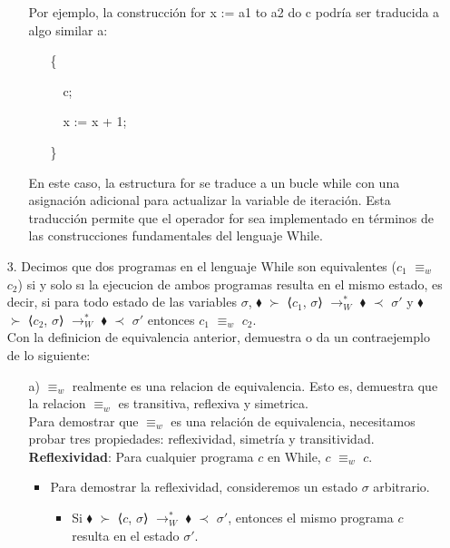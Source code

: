 \documentclass{article}
\begin{document}
\begin{itemize}
\begin{itemize}
            Por ejemplo, la construcción for x := a1 to a2 do c podría ser traducida a algo similar a:

            \begin{itemize}
                \item[ ]    \{
                \item[ ] \, \,       c;
                \item[ ] \, \,       x := x + 1;
                \item[ ]    \}
            \end{itemize}

            En este caso, la estructura for se traduce a un bucle while con una asignación adicional para actualizar la variable de iteración. Esta traducción permite que el operador for sea implementado en términos de las construcciones fundamentales del lenguaje While. 
        \end{itemize}

        \item[3.] Decimos que dos programas en el lenguaje While son equivalentes ($c_1$ $\equiv_w$ $c_2$) si y solo sı la ejecucion de ambos programas resulta en el mismo estado, es decir, si para todo estado de las variables $\sigma$, $\blacklozenge$ $\succ$  ⟨$c_1$, $\sigma$⟩ $\longrightarrow^{*}_{W}$ $\blacklozenge$ $\prec$ $\sigma'$ y $\blacklozenge$ $\succ$ ⟨$c_2$, $\sigma$⟩ $\longrightarrow^{*}_{W}$ $\blacklozenge$ $\prec$ $\sigma'$ entonces $c_1$ $\equiv_w$ $c_2$.\\
        Con la definicion de equivalencia anterior, demuestra o da un contraejemplo de lo siguiente:
        \begin{itemize}
            \item[a)] $\equiv_w$ realmente es una relacion de equivalencia. Esto es, demuestra que la relacion $\equiv_w$ es transitiva, reflexiva y simetrica.\\

            Para demostrar que $\equiv_w$ es una relación de equivalencia, necesitamos probar tres propiedades: reflexividad, simetría y transitividad.\\

            \textbf{Reflexividad}: Para cualquier programa $c$ en While, $c$ $\equiv_w$ $c$.

            \begin{itemize}
                \item Para demostrar la reflexividad, consideremos un estado $\sigma$ arbitrario.
                \begin{itemize}
                    \item Si $\blacklozenge$ $\succ$  ⟨$c$, $\sigma$⟩ $\longrightarrow^{*}_{W}$ $\blacklozenge$ $\prec$ $\sigma'$, entonces el mismo programa $c$ resulta en el estado $\sigma'$.


\end{itemize}
\end{itemize}
\end{itemize}
\end{itemize}
\end{document}
